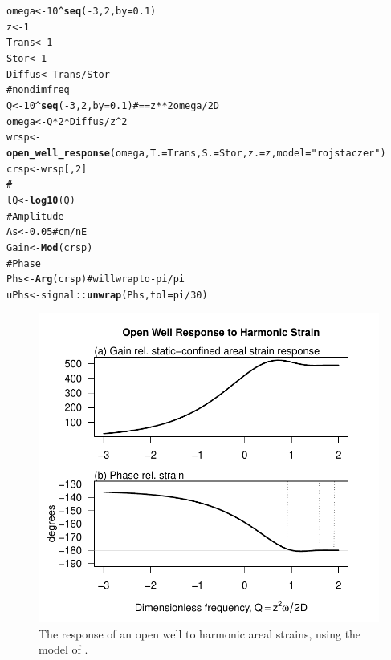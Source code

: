 \documentclass[10pt]{article}\usepackage{graphicx, color}
\makeatletter
\def\maxwidth{ %
  \ifdim\Gin@nat@width>\linewidth
    \linewidth
  \else
    \Gin@nat@width
  \fi
}
\newcommand{\hlfunctioncall}[1]{\textcolor[rgb]{0.501960784313725,0,0.329411764705882}{\textbf{#1}}}%
\newcommand{\hlstring}[1]{\textcolor[rgb]{0.6,0.6,1}{#1}}%
\newcommand{\hlcomment}[1]{\textcolor[rgb]{0.180392156862745,0.6,0.341176470588235}{#1}}%
\newenvironment{kframe}{%
 \def\at@end@of@kframe{}%
 \ifinner\ifhmode%
  \def\at@end@of@kframe{\end{minipage}}%
  \begin{minipage}{\columnwidth}%
 \fi\fi%
 \def\FrameCommand##1{\hskip\@totalleftmargin \hskip-\fboxsep
 \colorbox{shadecolor}{##1}\hskip-\fboxsep
     \hskip-\linewidth \hskip-\@totalleftmargin \hskip\columnwidth}%
 \MakeFramed {\advance\hsize-\width
   \@totalleftmargin\z@ \linewidth\hsize
   \@setminipage}}%
 {\par\unskip\endMakeFramed%
 \at@end@of@kframe}
\newenvironment{knitrout}{}{} %
\makeatother
\begin{document}
%
\begin{knitrout}
\color{fgcolor}\begin{kframe}
\begin{alltt}
omega <- 10^\hlfunctioncall{seq}(-3, 2, by = 0.1)
z <- 1
Trans <- 1
Stor <- 1
Diffus <- Trans/Stor
\hlcomment{# nondim freq}
Q <- 10^\hlfunctioncall{seq}(-3, 2, by = 0.1)  \hlcomment{# == z**2 omega / 2 D}
omega <- Q * 2 * Diffus/z^2
wrsp <- \hlfunctioncall{open_well_response}(omega, T. = Trans, S. = Stor, z. = z, model = \hlstring{"rojstaczer"})
crsp <- wrsp[, 2]
\hlcomment{#}
lQ <- \hlfunctioncall{log10}(Q)
\hlcomment{# Amplitude}
As <- 0.05  \hlcomment{# cm/nE}
Gain <- \hlfunctioncall{Mod}(crsp)
\hlcomment{# Phase}
Phs <- \hlfunctioncall{Arg}(crsp)  \hlcomment{# will wrap to -pi/pi}
uPhs <- signal::\hlfunctioncall{unwrap}(Phs, tol = pi/30)
\end{alltt}
\end{kframe}
\end{knitrout}


\begin{figure}[htb!]
\begin{center}
\begin{knitrout}
\color{fgcolor}
\includegraphics[width=\maxwidth]{figure/ROJRESPFIG} 

\end{knitrout}

\caption{The response of an open well to harmonic areal strains, using
the model of \citet{rojstaczer1988}.}
\label{fig:tmp}
\end{center}
\end{figure}




\printindex
\end{document}
